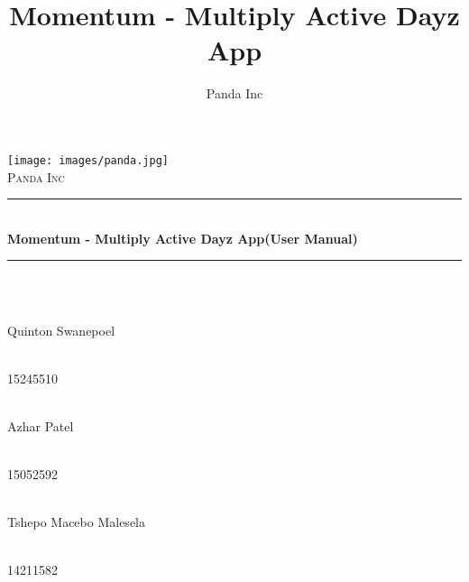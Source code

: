 \documentclass[11pt]{article}
\author{Panda Inc}
\title{Momentum - Multiply Active Dayz App}
\begin{document}
\begin{titlepage}

	\begin{center}
        \texttt{[image: images/panda.jpg]}\\[1cm]
		\textsc{\LARGE Panda Inc}\\[0.3cm]
		\rule{\linewidth}{0.5mm} \\[1cm]
		{ \huge \bfseries Momentum - Multiply Active Dayz App\newline \newline (User Manual)}\\[0.5cm]
		\rule{\linewidth}{0.5mm} \\[1cm]


		\begin{minipage}{0.4\textwidth}
			\begin{flushleft} \large
				\emph{} \\
				Quinton {Swanepoel}
			\end{flushleft}
		\end{minipage}
		\begin{minipage}{0.4\textwidth}
			\begin{flushright} \large
				\emph{} \\
				15245510
			\end{flushright}
		\end{minipage}

		\begin{minipage}{0.4\textwidth}
			\begin{flushleft} \large
            	\emph{} \\
				Azhar {Patel}
			\end{flushleft}
		\end{minipage}
		\begin{minipage}{0.4\textwidth}
			\begin{flushright} \large
				\emph{} \\
				15052592
			\end{flushright}
		\end{minipage}

		\begin{minipage}{0.4\textwidth}
			\begin{flushleft} \large
				\emph{} \\
				Tshepo Macebo {Malesela}
			\end{flushleft}
		\end{minipage}
		\begin{minipage}{0.4\textwidth}
			\begin{flushright} \large
				\emph{} \\
				14211582
			\end{flushright}
		\end{minipage}


\end{center}
\end{titlepage}
\end{document}
